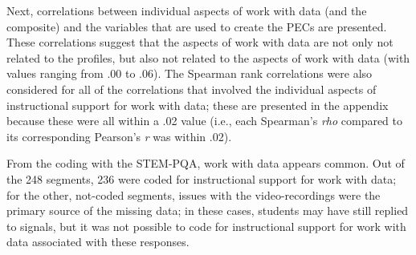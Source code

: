 \documentclass[]{book}
\theoremstyle{definition}
\theoremstyle{definition}
\theoremstyle{definition}
\theoremstyle{remark}
\begin{document}
Next, correlations between individual aspects of work with data (and the
composite) and the variables that are used to create the PECs are
presented. These correlations suggest that the aspects of work with data
are not only not related to the profiles, but also not related to the
aspects of work with data (with values ranging from .00 to .06). The
Spearman rank correlations were also considered for all of the
correlations that involved the individual aspects of instructional
support for work with data; these are presented in the appendix because
these were all within a .02 value (i.e., each Spearman's \emph{rho}
compared to its corresponding Pearson's \emph{r} was within .02).

\begin{landscape}\begin{table}[H]
\centering
{}
\end{table}
\end{landscape}

From the coding with the STEM-PQA, work with data appears common. Out of
the 248 segments, 236 were coded for instructional support for work with
data; for the other, not-coded segments, issues with the
video-recordings were the primary source of the missing data; in these
cases, students may have still replied to signals, but it was not
possible to code for instructional support for work with data associated
with these responses.
\end{document}
